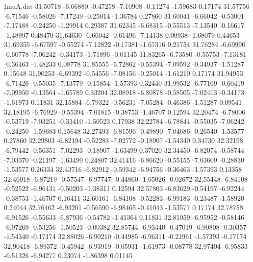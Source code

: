 \begin{filecontents}{ImuA.dat}
  31.50718   -6.66880   -0.47258   -7.10908   -0.11274   -1.59683    0.17174
  31.57756   -6.71546   -0.58026   -7.17249   -0.25014   -1.36784    0.27860
  31.60041   -6.66042   -0.53001   -7.17488   -0.24250   -1.29914    0.29387
  31.62345   -6.68315   -0.55513   -7.13540   -0.16617   -1.48997    0.48470
  31.64630   -6.66042   -0.61496   -7.14138    0.00938   -1.68079    0.44653
  31.69355   -6.67597   -0.55274   -7.12822   -0.17381   -1.67316    0.21754
  31.76284   -6.69990   -0.60778   -7.06242   -0.34173   -1.71896   -0.01145
  31.83265   -6.73580   -0.55753   -7.13181   -0.36463   -1.48233    0.08778
  31.85555   -6.72862   -0.55394   -7.09592   -0.34937   -1.51287    0.15648
  31.90253   -6.69392   -0.54556   -7.08156   -0.25014   -1.61210    0.17174
  31.94953   -6.71426   -0.55035   -7.13779   -0.15854   -1.57393    0.32440
  31.99532   -6.77169   -0.60419   -7.09950   -0.13564   -1.65789    0.33204
  32.08918   -6.80878   -0.58505   -7.02413   -0.34173   -1.61973    0.11831
  32.15884   -6.79322   -0.56231   -7.05284   -0.46386   -1.51287    0.09541
  32.18195   -6.76929   -0.55394   -7.01815   -0.38753   -1.46707    0.12594
  32.20474   -6.78006   -0.53719   -7.03251   -0.33410   -1.50523    0.17938
  32.22784   -6.78844   -0.55035   -7.06242   -0.24250   -1.59683    0.15648
  32.27493   -6.81596   -0.49890   -7.04686   -0.26540   -1.53577    0.27860
  32.29803   -6.82194   -0.52283   -7.02772   -0.18907   -1.54340    0.34730
  32.32198   -6.79442   -0.56351   -7.02293   -0.18907   -1.63499    0.37020
  32.34450   -6.82074   -0.58744   -7.03370   -0.21197   -1.63499    0.24807
  32.41416   -6.86620   -0.55155   -7.03609   -0.28830   -1.53577    0.26334
  32.43716   -6.82912   -0.59342   -6.94756   -0.36463   -1.57393    0.13358
  32.46018   -6.87219   -0.57547   -6.97747   -0.44860   -1.65026   -0.02672
  32.55448   -6.84108   -0.52522   -6.96431   -0.50203   -1.38311    0.12594
  32.57803   -6.83629   -0.54197   -6.92244   -0.38753   -1.46707    0.16411
  32.60161   -6.84108   -0.52283   -6.99183   -0.23487   -1.58920    0.24044
  32.76462   -6.93201   -0.56590   -6.98465   -0.41043   -1.53577    0.17174
  32.78758   -6.91526   -0.55633   -6.87936   -0.54782   -1.41364    0.11831
  32.81059   -6.95952   -0.58146   -6.97269   -0.53256   -1.50523   -0.00382
  32.85744   -6.93440   -0.47019   -6.90808   -0.30357   -1.54340   -0.17174
  32.88026   -6.90210   -0.44985   -6.96311   -0.21961   -1.57393   -0.17174
  32.90418   -6.89372   -0.45942   -6.93919   -0.05931   -1.61973   -0.08778
  32.97404   -6.95833   -0.51326   -6.94277    0.23074   -1.86398    0.01145

\end{filecontents}
